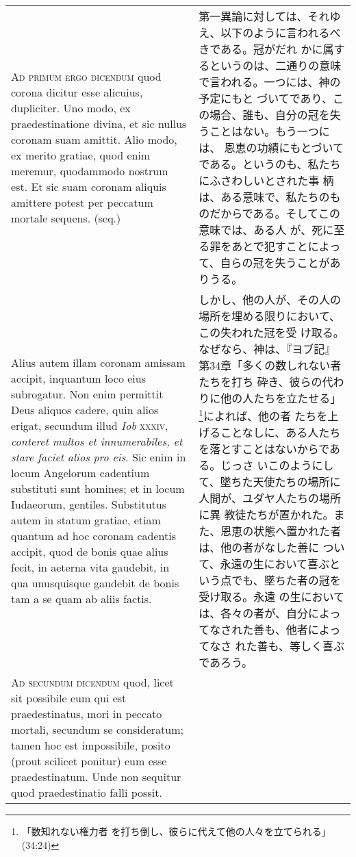 \documentclass[10pt]{jsarticle} %
\begin{document}
\begin{longtable}{p{21em}p{21em}}
\\


{\scshape Ad primum ergo dicendum} quod corona dicitur
esse alicuius, dupliciter. Uno modo, ex praedestinatione divina, et sic
nullus coronam suam amittit. Alio modo, ex merito gratiae, quod enim
meremur, quodammodo nostrum est. Et sic suam coronam aliquis amittere
potest per peccatum mortale sequens. (seq.)


&

第一異論に対しては、それゆえ、以下のように言われるべきである。冠がだれ
かに属するというのは、二通りの意味で言われる。一つには、神の予定にもと
づいてであり、この場合、誰も、自分の冠を失うことはない。もう一つには、
恩恵の功績にもとづいてである。というのも、私たちにふさわしいとされた事
柄は、ある意味で、私たちのものだからである。そしてこの意味では、ある人
が、死に至る罪をあとで犯すことによって、自らの冠を失うことがありうる。


\\

Alius autem illam coronam amissam
accipit, inquantum loco eius subrogatur. Non enim permittit Deus aliquos
cadere, quin alios erigat, secundum illud {\itshape Iob} {\scshape xxxiv}, {\itshape conteret multos et
innumerabiles, et stare faciet alios pro eis}.
Sic enim in locum
Angelorum cadentium substituti sunt homines; et in locum Iudaeorum,
gentiles. Substitutus autem in statum gratiae, etiam quantum ad hoc
coronam cadentis accipit, quod de bonis quae alius fecit, in aeterna
vita gaudebit, in qua unusquisque gaudebit de bonis tam a se quam ab
aliis factis.


&

しかし、他の人が、その人の場所を埋める限りにおいて、この失われた冠を受
け取る。なぜなら、神は、『ヨブ記』第34章「多くの数しれない者たちを打ち
砕き、彼らの代わりに他の人たちを立たせる」\footnote{「数知れない権力者
を打ち倒し、彼らに代えて他の人々を立てられる」(34:24)}によれば、他の者
たちを上げることなしに、ある人たちを落とすことはないからである。じっさ
いこのようにして、墜ちた天使たちの場所に人間が、ユダヤ人たちの場所に異
教徒たちが置かれた。また、恩恵の状態へ置かれた者は、他の者がなした善に
ついて、永遠の生において喜ぶという点でも、墜ちた者の冠を受け取る。永遠
の生においては、各々の者が、自分によってなされた善も、他者によってなさ
れた善も、等しく喜ぶであろう。


\\


{\scshape Ad secundum dicendum} quod, licet sit
possibile eum qui est praedestinatus, mori in peccato mortali, secundum
se consideratum; tamen hoc est impossibile, posito (prout scilicet
ponitur) eum esse praedestinatum. Unde non sequitur quod praedestinatio
falli possit.


\end{longtable}
\end{document}
